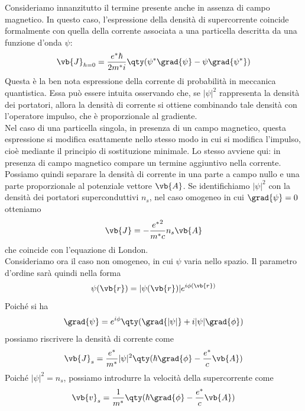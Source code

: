Consideriamo innanzitutto il termine presente anche in assenza di campo magnetico. In questo caso, l'espressione della densità di supercorrente coincide formalmente con quella della corrente associata a una particella descritta da una funzione d'onda $\psi$:
\begin{equation*}
   \vb{J}_{h=0}
   = \frac{e^* \hbar}{2m^* i}
   \qty( \psi^* \grad{\psi} - \psi \grad{\psi^*} )
\end{equation*}
Questa è la ben nota espressione della corrente di probabilità in meccanica quantistica. Essa può essere intuita osservando che, se $|\psi|^2$ rappresenta la densità dei portatori, allora la densità di corrente si ottiene combinando tale densità con l'operatore impulso, che è proporzionale al gradiente.\\
Nel caso di una particella singola, in presenza di un campo magnetico, questa espressione si modifica esattamente nello stesso modo in cui si modifica l'impulso, cioè mediante il principio di sostituzione minimale. Lo stesso avviene qui: in presenza di campo magnetico compare un termine aggiuntivo nella corrente.\\
Possiamo quindi separare la densità di corrente in una parte a campo nullo e una parte proporzionale al potenziale vettore $\vb{A}$. Se identifichiamo $|\psi|^2$ con la densità dei portatori superconduttivi $n_s$, nel caso omogeneo in cui $\grad{\psi}=0$ otteniamo
\begin{equation*}
   \vb{J}
   = - \frac{{e^*}^2}{m^* c} n_s \vb{A}
\end{equation*}
che coincide con l'equazione di London.\\
Consideriamo ora il caso non omogeneo, in cui $\psi$ varia nello spazio. Il parametro d'ordine sarà quindi nella forma
\begin{equation}
   \psi(\vb{r}) = |\psi(\vb{r})| e^{i\phi(\vb{r})}
   \label{eq:psi_con_fase}
\end{equation}
Poiché si ha
\begin{equation*}
   \grad{\psi}
   = e^{i\phi} \qty( \grad{|\psi|} + i |\psi| \grad{\phi} )
\end{equation*}
possiamo riscrivere la densità di corrente come
\begin{equation}
   \vb{J}_s
   = \frac{e^*}{m^*} |\psi|^2
   \qty( \hbar \grad{\phi} - \frac{e^*}{c} \vb{A} )
   \label{eq:densita_di_supercorrente}
\end{equation}
Poiché $|\psi|^2 = n_s$, possiamo introdurre la velocità della supercorrente come
\begin{equation*}
   \vb{v}_s
   = \frac{1}{m^*}
   \qty( \hbar \grad{\phi} - \frac{e^*}{c} \vb{A} )
\end{equation*}
